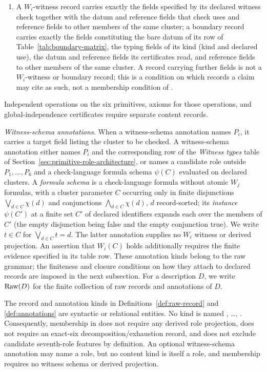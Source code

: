 \begin{definition}[Annotations]
\begin{enumerate}[label=(\arabic*),topsep=2pt,itemsep=1pt]
  \item A \(W_i\)-witness record carries exactly the fields specified by its declared witness check together with the datum and reference fields that check uses and reference fields to other members of the same cluster; a boundary record carries exactly the fields constituting the bare datum of its row of Table~\ref{tab:boundary-matrix}, the typing fields of its kind (kind and declared use), the datum and reference fields its certificates read, and reference fields to other members of the same cluster. A record carrying further fields is not a \(W_i\)-witness or boundary record; this is a condition on which records a claim may cite as such, not a membership condition of \FATCD{}.
\end{enumerate}
\noindent Independent operations on the six primitives, axioms for those operations, and global-independence certificates require separate content records.
\par\emph{Witness-schema annotations.} When a witness-schema annotation names
\(P_i\), it carries a target field listing the cluster to be checked. A
witness-schema annotation either names
\(P_i\) and the corresponding row of the \emph{Witness types} table of
Section~\ref{sec:primitive-role-architecture}, or names a candidate role
outside \(P_1,\ldots,P_6\) and
a check-language formula schema \(\psi(C)\) evaluated on declared clusters. A \emph{formula schema} is a check-language formula without atomic \(W_j\) formulas, with a cluster parameter \(C\) occurring only in finite disjunctions \(\bigvee_{d\in C}\chi(d)\) and conjunctions \(\bigwedge_{d\in C}\chi(d)\), \(d\) record-sorted; its \emph{instance} \(\psi(C')\) at a finite set \(C'\) of declared identifiers expands each over the members of \(C'\) (the empty disjunction being false and the empty conjunction true). We write \(t\in C\) for \(\bigvee_{d\in C}t=d\).
The latter annotation supplies no \(W_i\) witness or derived projection. An
assertion that \(W_i(C)\) holds additionally requires the finite evidence
specified in its table row.
These annotation kinds belong to the raw grammar; the finiteness and closure
conditions on how they attach to declared records are imposed in the next
subsection. For a description \(D\), we write \(\operatorname{Raw}\!\left(D\right)\) for the finite
collection of raw records and annotations of \(D\).
\end{definition}

\begin{remark}\label{rem:alphabet-independence}
The record and annotation kinds in Definitions~\ref{def:raw-record} and
\ref{def:annotations} are syntactic or relational entities. No kind is named
\Pone{}, \ldots, \Psix{}. Consequently, membership in \FATCD{} does not
require any derived role projection, does not require an exact-six
decomposition/exhaustion record, and does not exclude candidate seventh-role
features by definition. An optional witness-schema annotation may name a
role, but no content kind is itself a role, and membership requires no
witness schema or derived projection.
\end{remark}

